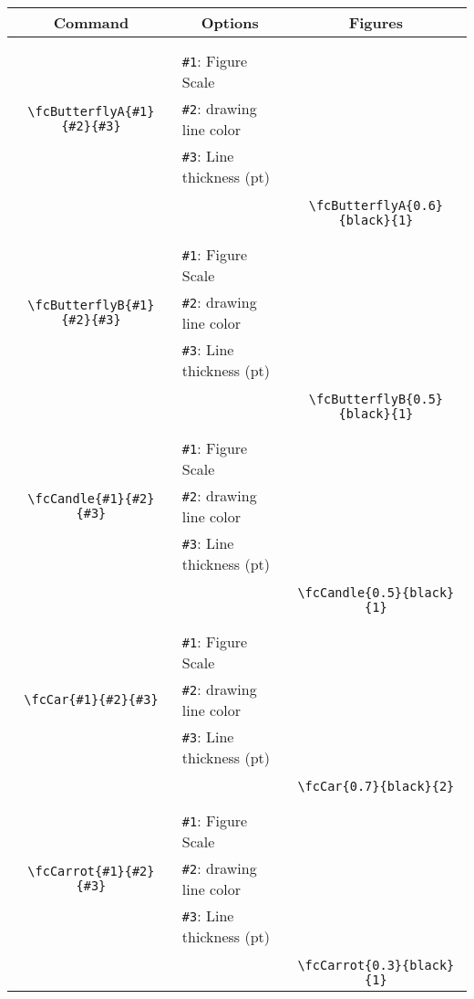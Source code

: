 \documentclass[x11names]{article}
\begin{document}
\begin{table}[H]\centering\begin{tabular}{|c|l|c|}\hline {\bf Command}& \multicolumn{1}{c|}{{\bf Options}} & {\bf Figures}\\  \hline	&&\multirow{5}{*}{\fcButterflyA{0.6}{black}{1}}\\	&&\\	&\verb|#1|: Figure Scale &\\	\verb|\fcButterflyA{#1}{#2}{#3}|&	\verb|#2|: drawing line color &\\	&\verb|#3|: Line thickness (pt) &\\ &&\\&&	\verb|\fcButterflyA{0.6}{black}{1}|\\\hline 	
	&&\multirow{5}{*}{\fcButterflyB{0.5}{black}{1}}\\	&&\\	&\verb|#1|: Figure Scale &\\	\verb|\fcButterflyB{#1}{#2}{#3}|&	\verb|#2|: drawing line color &\\	&\verb|#3|: Line thickness (pt) &\\ &&\\&&	\verb|\fcButterflyB{0.5}{black}{1}|\\\hline 	
	&&\multirow{5}{*}{\fcCandle{0.5}{black}{1}}\\	&&\\	&\verb|#1|: Figure Scale &\\	\verb|\fcCandle{#1}{#2}{#3}|&	\verb|#2|: drawing line color &\\	&\verb|#3|: Line thickness (pt) &\\ &&\\&&	\verb|\fcCandle{0.5}{black}{1}|\\\hline 	
	&&\multirow{5}{*}{\fcCar{0.7}{black}{2}}\\	&&\\	&\verb|#1|: Figure Scale &\\	\verb|\fcCar{#1}{#2}{#3}|&	\verb|#2|: drawing line color &\\	&\verb|#3|: Line thickness (pt) &\\ &&\\&&	\verb|\fcCar{0.7}{black}{2}|\\\hline 	
	&&\multirow{5}{*}{\fcCarrot{0.3}{black}{1}}\\	&&\\	&\verb|#1|: Figure Scale &\\	\verb|\fcCarrot{#1}{#2}{#3}|&	\verb|#2|: drawing line color &\\	&\verb|#3|: Line thickness (pt) &\\ &&\\&&	\verb|\fcCarrot{0.3}{black}{1}|\\\hline 	

\end{tabular}
\end{table}
\end{document}
